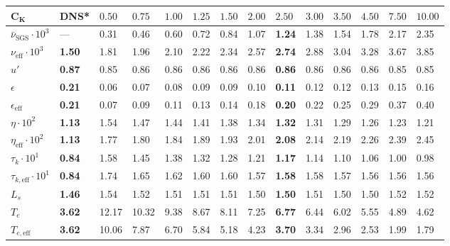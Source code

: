 \documentclass{pracamgren}
\begin{document}
\begin{table}[h]
\centering
\scriptsize
\begin{tabular}{llllllllllllll}
$\mathbf{C_K}$ & \textbf{DNS}* & $0.50$ & $0.75$ & $1.00$ & $1.25$ & $1.50$ & $2.00$ & $\mathbf{2.50}$ & $3.00$ & $3.50$ & $4.50$ & $7.50$ & $10.00$ \\ \hline

$\bar{\nu}_{\text{SGS}} \cdot 10^3$ & --- & 0.31 & 0.46 & 0.60 & 0.72 & 0.84 & 1.07 & \textbf{1.24} & 1.38 & 1.54 & 1.78 & 2.17 & 2.35 \\
$\nu_{\text{eff}}  \cdot 10^3$ & \textbf{1.50} & 1.81 & 1.96 & 2.10 & 2.22 & 2.34 & 2.57 & \textbf{2.74} & 2.88 & 3.04 & 3.28 & 3.67 & 3.85 \\

$u'$ & \textbf{0.87} & 0.85 & 0.86 & 0.86 & 0.86 & 0.86 & 0.86 & \textbf{0.86} & 0.86 & 0.86 & 0.86 & 0.85 & 0.85 \\

$\epsilon$ & \textbf{0.21} & 0.06 & 0.07 & 0.08 & 0.09 & 0.09 & 0.10 & \textbf{0.11} & 0.12 & 0.12 & 0.13 & 0.15 & 0.16 \\
$\epsilon_{\text{eff}}$ & \textbf{0.21} & 0.07 & 0.09 & 0.11 & 0.13 & 0.14 & 0.18 & \textbf{0.20 } & 0.22 & 0.25 & 0.29 & 0.37 & 0.40 \\ \hline

$\eta \cdot 10^2$ & \textbf{1.13} & 1.54 & 1.47 & 1.44 & 1.41 & 1.38 & 1.34 & \textbf{1.32} & 1.31 & 1.29 & 1.26 & 1.23 & 1.21 \\
$\eta_{\text{eff}} \cdot 10^2$ & \textbf{1.13} & 1.77 & 1.80 & 1.84 & 1.89 & 1.93 & 2.01 & \textbf{2.08} & 2.14 & 2.19 & 2.26 & 2.39 & 2.45 \\

$\tau_k \cdot 10^1$ & \textbf{0.84} & 1.58 & 1.45 & 1.38 & 1.32 & 1.28 & 1.21 & \textbf{1.17} & 1.14 & 1.10 & 1.06 & 1.00 & 0.98 \\
$\tau_{k, \text{eff}} \cdot 10^1$ & \textbf{0.84} & 1.74 & 1.65 & 1.62 & 1.60 & 1.60 & 1.57 & \textbf{1.58} & 1.58 & 1.57 & 1.56 & 1.56 & 1.56 \\ \hline

$L_s$ & \textbf{1.46} & 1.54 & 1.52 & 1.51 & 1.51 & 1.51 & 1.50 & \textbf{1.50} & 1.51 & 1.50 & 1.50 & 1.52 & 1.52 \\
$T_e$ & \textbf{3.62} & 12.17 & 10.32 & 9.38 & 8.67 & 8.11 & 7.25 & \textbf{6.77} & 6.44 & 6.02 & 5.55 & 4.89  & 4.62 \\
$T_{e, \text{eff}}$ & \textbf{3.62} & 10.06 & 7.87 & 6.70 & 5.84 & 5.18 & 4.23 & \textbf{3.70} & 3.34 & 2.96 & 2.53 & 1.99 & 1.79 \\ \hline


\end{tabular}
\end{table}
\end{document}
